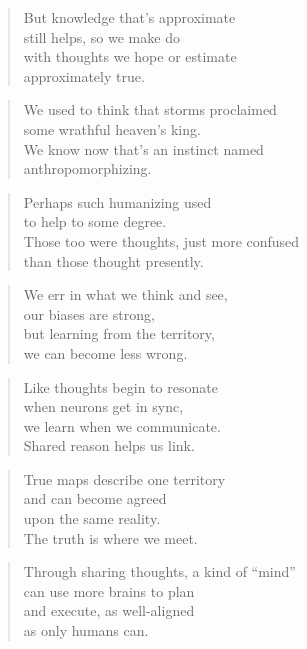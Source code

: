 \documentclass[14pt,a4paper]{article}
\begin{document}
\begin{verse}
But knowledge that’s approximate\\
still helps, so we make do\\
with thoughts we hope or estimate\\
approximately true.
\end{verse}

\begin{verse}
We used to think that storms proclaimed\\
some wrathful heaven’s king.\\
We know now that’s an instinct named\\
anthropomorphizing.
\end{verse}

\begin{verse}
Perhaps such humanizing used\\
to help to some degree.\\
Those too were thoughts, just more confused\\
than those thought presently.
\end{verse}

\begin{verse}
We err in what we think and see,\\
our biases are strong,\\
but learning from the territory,\\
we can become less wrong.
\end{verse}

\begin{verse}
Like thoughts begin to resonate\\
when neurons get in sync,\\
we learn when we communicate.\\
Shared reason helps us link.
\end{verse}

\begin{verse}
True maps describe one territory\\
and can become agreed\\
upon the same reality.\\
The truth is where we meet.
\end{verse}

\begin{verse}
Through sharing thoughts, a kind of “mind”\\
can use more brains to plan\\
and execute, as well-aligned\\
as only humans can.
\end{verse}
\end{document}
